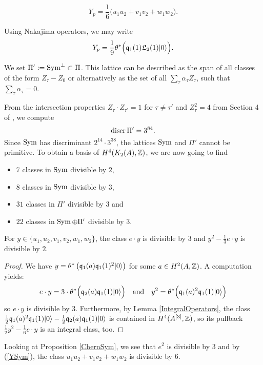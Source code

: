 \begin{corollary}\label{Classuvw}
\begin{equation} \label{YSym}
Y_p =  \frac{1}{6}\Big(u_1u_2 + v_1v_2 +  w_1 w_2 \Big).
\end{equation}
\end{corollary}
\begin{remark}
Using Nakajima operators, we may write
\begin{gather}
Y_p = \frac{1}{9} \theta^*\Big( \mathfrak{q}_1(1)\mathfrak L_2(1) |0\rangle \Big).
\end{gather}

\end{remark}
\begin{definition}
We set $\Pi' := \operatorname{Sym}^\perp \subset \Pi$. This lattice can be described as the span of all classes of the form $Z_\tau -Z_0$ or alternatively as the set of all
$
\sum_\tau \alpha_\tau Z_\tau $, such that $ \sum_\tau \alpha_\tau =0$.
\end{definition}
From the intersection properties $Z_\tau \cdot Z_{\tau'} = 1$ for $\tau\neq \tau'$ and $Z_\tau^2 = 4$ from Section 4 of \cite{Hassett}, we compute
\begin{equation}
 \operatorname{discr} \Pi' = 3^{84}.
\end{equation}
Since $\operatorname{Sym}$ has discriminant $2^{14}\cdot 3^{38}$, the lattices $\operatorname{Sym}$ and $\Pi'$ cannot be primitive. To obtain a basis of $H^4(K_{ 2 }( A ),\mathbb{Z})$, we are now going to find
\begin{itemize}
 \item $7$ classes in $\operatorname{Sym}$ divisible by $2$,
 \item $8$ classes in $\operatorname{Sym}$ divisible by $3$,
 \item $31$ classes in $\Pi'$ divisible by $3$ and
 \item $22$ classes in $\operatorname{Sym}\oplus\Pi'$ divisible by $3$.
\end{itemize}

\begin{proposition}\label{classedivisibleSym}
For $y\in\{u_1,u_2,v_1,v_2,w_1,w_2\}$, the class
$
e \cdot y
$
is divisible by $3$ and 
$
 y^2 - \frac{1}{3} e\cdot y
$
is divisible by $2$.
\end{proposition}
\begin{proof}
We have $y= \theta^*\left(\mathfrak{q}_1(a)\mathfrak{q}_1(1)^2|0\rangle\right)$ for some $a\in H^2(A,\mathbb{Z})$. A computation yields:
$$
e\cdot y = 3\cdot \theta^*\Big( \mathfrak{q}_2(a)\mathfrak{q}_1(1)|0\rangle \Big)
\quad \text{and}\quad
y^2 = \theta^*\Big(\mathfrak{q}_1(a)^2\mathfrak{q}_1(1)|0\rangle\Big)
$$
so $e\cdot y$ is divisible by $3$. Furthermore, by Lemma \ref{IntegralOperators}, the class 
$
\frac{1}{2} \mathfrak{q}_1(a)^2\mathfrak{q}_1(1)|0\rangle - \frac{1}{2} \mathfrak{q}_2(a)\mathfrak{q}_1(1)|0\rangle 
$
is contained in $H^4(A^{[3]},\mathbb{Z})$, so its pullback
$
 \frac{1}{2}y^2 - \frac{1}{6} e\cdot y
$
is an integral class, too.
\end{proof}
Looking at Proposition \ref{ChernSym}, we see that
$e^2$ is divisible by $3$ and by (\ref{YSym}),
the class $u_1u_2 + v_1v_2+w_1w_2$ is divisible by 6.

